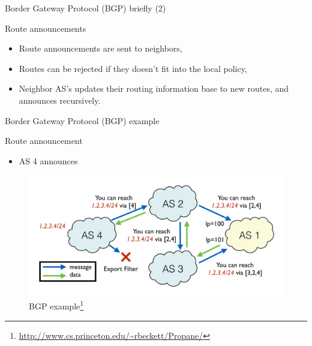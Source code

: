 \begin{frame}{Border Gateway Protocol (BGP) briefly (2)}
    \begin{block}{Route announcements}
        \begin{itemize}
            \item Route announcements are sent to neighbors,
            \item Routes can be \textcolor{ReneOrange}{rejected} if they doesn't fit into the local policy,
            \item Neighbor AS's updates their routing information base to new routes, and announces recursively.
        \end{itemize}
    \end{block}
\end{frame}

\begin{frame}{Border Gateway Protocol (BGP) example}
    \begin{block}{Route announcement}
        \begin{itemize}
            \item AS 4 announces 
        \end{itemize}
    \end{block}
    \begin{figure}
        \includegraphics[height=0.45\textheight,keepaspectratio]{figures/BGP-protocol.jpg}
        \caption*{BGP example\footnote{\url{http://www.cs.princeton.edu/~rbeckett/Propane/}}}
    \end{figure}
\end{frame}

